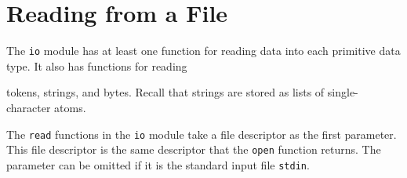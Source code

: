 \section{Reading from a File}
The \texttt{io} module has at least one function for reading data into each primitive data type.  It also has functions for reading tokens, strings, and bytes.  Recall that strings are stored as lists of single-character atoms.

The \texttt{read} functions in the \texttt{io} module take a file descriptor as the first parameter.  This file descriptor is the same descriptor that the \texttt{open} function returns. The parameter can be omitted if it is the standard input file \texttt{stdin}.

